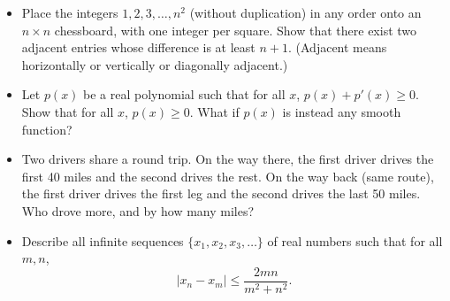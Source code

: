 \documentclass[12pt]{article}
\begin{document}
\begin{itemize}
  \item Place the integers $1, 2, 3, \ldots, n^2$ (without duplication) in any order onto an $n \times n$ chessboard, with one integer per square. Show that there exist two adjacent entries whose difference is at least $n + 1$. (Adjacent means horizontally or vertically or diagonally adjacent.)

  \item Let $p(x)$ be a real polynomial such that for all $x$, $p(x) + p'(x) \ge 0$. Show that for all $x$, $p(x) \ge 0$. What if $p(x)$ is instead any smooth function?

  \item Two drivers share a round trip. On the way there, the first driver drives the first 40 miles and the second drives the rest. On the way back (same route), the first driver drives the first leg and the second drives the last 50 miles. Who drove more, and by how many miles?

  \item Describe all infinite sequences $\{x_1, x_2, x_3, \ldots\}$ of real numbers such that for all $m, n$,
  \[
  |x_n - x_m| \le \frac{2mn}{m^2 + n^2}.
  \]
\end{itemize}
\end{document}
